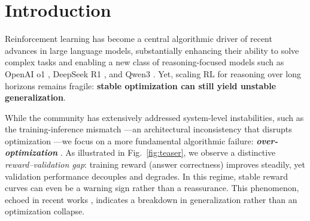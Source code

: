 \section{Introduction}

Reinforcement learning has become a central algorithmic driver of recent advances in large language models, substantially enhancing their ability to solve complex tasks and enabling a new class of reasoning-focused models such as OpenAI o1 \citep{Openai-O1}, DeepSeek R1 \citep{Deepseek-R1}, and Qwen3 \citep{Qwen3}. 
Yet, scaling RL for reasoning over long horizons remains fragile: \textbf{stable optimization can still yield unstable generalization}.

While the community has extensively addressed system-level instabilities, such as the training-inference mismatch \citep{GSPO, IcePop, XiaomiR3, MiniRL}---an architectural inconsistency that disrupts optimization \citep{TIS, SpeedStability}---we focus on a more fundamental algorithmic failure: \textit{\textbf{over-optimization}} \citep{gao2023scaling}.
As illustrated in Fig.~\ref{fig:teaser}, we observe a distinctive \textit{reward--validation gap}: training reward (answer correctness) improves steadily, yet validation performance decouples and degrades.
In this regime, stable reward curves can even be a warning sign rather than a reassurance.
This phenomenon, echoed in recent works \citep{clipfairly, zhang2025gepo}, indicates a breakdown in generalization rather than an optimization collapse.


